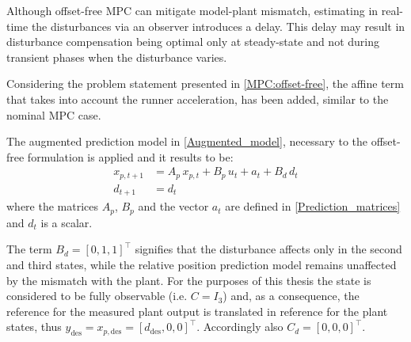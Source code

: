 \documentclass[a4paper,12pt,oneside]{book}
\begin{document}
Although offset-free MPC can mitigate model-plant mismatch, estimating in real-time the disturbances via an observer introduces a delay. 
This delay may result in disturbance compensation being optimal only at steady-state and not during transient phases when the disturbance varies.

\bigskip
Considering the problem statement presented in \eqref{MPC:offset-free}, the affine term that takes into account the runner acceleration, has been added, similar to the nominal MPC case.

The augmented prediction model in \eqref{Augmented_model}, necessary to the offset-free formulation is applied and it results to be:
\begin{equation}
\begin{aligned}
	x_{p,t+1} & = A_p \, x_{p,t} + B_p \, u_t + a_t + B_d \, d_t \\
    	d_{t+1} & = d_t
\end{aligned}
\label{Offset-free_prediction_model_MPC}
\end{equation}
where the matrices $A_p$, $B_p$ and the vector $a_t$ are defined in \eqref{Prediction_matrices} and $d_t$ is a scalar.

The term $B_d = [0, 1, 1]^\top$ signifies that the disturbance affects only in the second and third states, while the relative position prediction model remains unaffected by the mismatch with the plant.
For the purposes of this thesis the state is considered to be fully observable (i.e. $C = I_3$) and, as a consequence, the reference for the measured plant output is translated in reference for the plant states, thus $y_{\text{des}} = x_{p,\text{des}} = [d_{\text{des}}, 0, 0] ^\top$.
Accordingly also $C_d = [0, 0, 0]^\top$. 
\end{document}
